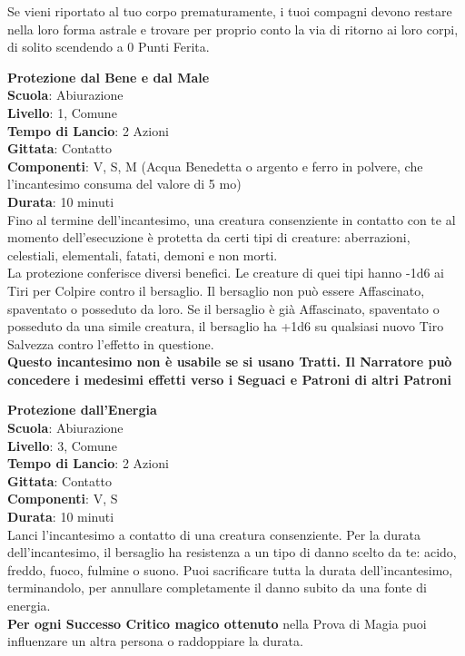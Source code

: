 \begin{multicols}{2}
Se vieni riportato al tuo corpo prematuramente, i tuoi compagni devono restare nella loro forma astrale e trovare per proprio conto la via di ritorno ai loro corpi, di solito scendendo a 0 Punti Ferita.

\medskip\textbf{Protezione dal Bene e dal Male}\\
\textbf{Scuola}: Abiurazione\\
\textbf{Livello}: 1, Comune\\
\textbf{Tempo di Lancio}: 2 Azioni\\
\textbf{Gittata}: Contatto\\
\textbf{Componenti}: V, S, M (Acqua Benedetta o argento e ferro in polvere, che l'incantesimo consuma del valore di 5 mo)\\
\textbf{Durata}: 10 minuti\\
Fino al termine dell'incantesimo, una creatura consenziente in contatto con te al momento dell'esecuzione è protetta da certi tipi di creature: aberrazioni, celestiali, elementali, fatati, demoni e non morti.\\
La protezione conferisce diversi benefici. Le creature di quei tipi hanno -1d6 ai Tiri per Colpire contro il bersaglio. Il bersaglio non può essere Affascinato, spaventato o posseduto da loro. Se il bersaglio è già Affascinato, spaventato o posseduto da una simile creatura, il bersaglio ha +1d6 su qualsiasi nuovo Tiro Salvezza contro l'effetto in questione.\\
\textbf{Questo incantesimo non è usabile se si usano Tratti. Il Narratore può concedere i medesimi effetti verso i Seguaci e Patroni di altri Patroni}

\medskip\textbf{Protezione dall'Energia}\\
\textbf{Scuola}: Abiurazione\\
\textbf{Livello}: 3, Comune\\
\textbf{Tempo di Lancio}: 2 Azioni\\
\textbf{Gittata}: Contatto\\
\textbf{Componenti}: V, S\\
\textbf{Durata}: 10 minuti\\
Lanci l'incantesimo a contatto di una creatura consenziente. Per la durata dell'incantesimo, il bersaglio ha resistenza a un tipo di danno scelto da te: acido, freddo, fuoco, fulmine o suono. Puoi sacrificare tutta la durata dell'incantesimo, terminandolo, per annullare completamente il danno subito da una fonte di energia.\\
\textbf{Per ogni Successo Critico magico ottenuto} nella Prova di Magia puoi influenzare un altra persona o raddoppiare la durata.


\end{multicols}
